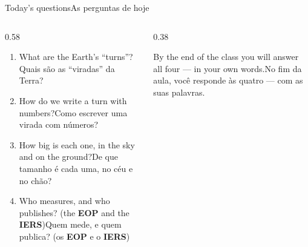 \documentclass[aspectratio=169,11pt]{beamer}
\newcommand{\tr}[2]{\ifEN#2\else#1\fi}
\newcommand{\bnum}[1]{\textbf{\textcolor{mTeal}{#1}}}
\begin{document}
\begin{frame}{\tr{As perguntas de hoje}{Today's questions}}
  \begin{columns}[T]
    \begin{column}{0.58\textwidth}
      \begin{enumerate}
        \setlength{\itemsep}{8pt}
        \item \tr{Quais são as ``viradas'' da Terra?}{What are the Earth's ``turns''?}
        \item \tr{Como escrever uma virada com números?}{How do we write a turn with numbers?}
        \item \tr{De que tamanho é cada uma, no céu e no chão?}{How big is each one, in the sky and on the ground?}
        \item \tr{Quem mede, e quem publica? (os \bnum{EOP} e o \bnum{IERS})}{Who measures, and who publishes? (the \bnum{EOP} and the \bnum{IERS})}
      \end{enumerate}
    \end{column}
    \begin{column}{0.38\textwidth}
      \begin{ideia}[title={\tr{Combinado}{Deal}}]
        \tr{No fim da aula, você responde às quatro --- com as suas palavras.}{By the end of the class you will answer all four --- in your own words.}
      \end{ideia}
    \end{column}
  \end{columns}
\end{frame}
\end{document}
